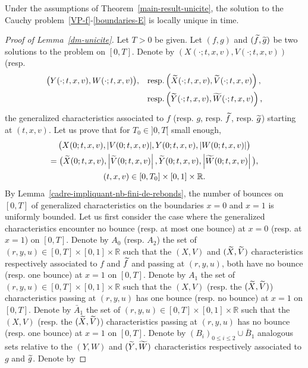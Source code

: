 \documentclass[AHL,Unicode,longabstracts,published]{cedram}
\newcommand{\R}{\mathbb{R}}
\let\oldtilde\tilde
\renewcommand*{\tilde}[1]{\mathchoice{\widetilde{#1}}{\widetilde{#1}}{\oldtilde{#1}}{\oldtilde{#1}}}
\begin{document}
\begin{lemm}\label{dm-unicite}
Under the assumptions of Theorem~\ref{main-result-unicite}, the solution to the Cauchy problem~\eqref{VP-f}-\eqref{boundaries-E} is locally unique in time.
\end{lemm}
\begin{proof}[{Proof of Lemma~\ref{dm-unicite}}]
Let $T>0$ be given. Let $(f,g)$ and $(\tilde{f},\tilde{g})$ be two solutions to the problem on $[0,T]$. Denote by $(X(\cdot ; t,x,v),V(\cdot ; t,x,v))$ (resp.
\begin{align*}
\big(Y(\cdot ; t,x,v),W(\cdot ; t,x,v)\big), \quad &\text{resp.} \left(\tilde{X}(\cdot ; t,x,v),\tilde{V}(\cdot ; t,x,v)\right), \\ 
&\text{resp.} \left(\tilde{Y}(\cdot ; t,x,v),\tilde{W}(\cdot ; t,x,v)\right),
\end{align*}
the generalized characteristics associated to $f$ (resp. $g$, resp. $\tilde{f}$, resp. $\tilde{g}$) starting at $(t,x,v)$. Let us prove that for $T_0\in]0,T[$ small enough,
\begin{multline*}
\big(X(0;t,x,v),|V(0;t,x,v)|,Y(0;t,x,v),|W(0;t,x,v)|\big)\\
= \big(\tilde{X}(0;t,x,v),\left|\tilde{V}(0;t,x,v)\right|,\tilde{Y}(0;t,x,v),\left|\tilde{W}(0;t,x,v)\right|\big),\\
(t,x,v)\in [0,T_0] \times [0,1] \times \R.
\end{multline*}
By Lemma~\ref{cadre-impliquant-nb-fini-de-rebonds}, the number of bounces on $[0,T]$ of generalized characteristics on the boundaries $x=0$ and $x=1$ is uniformly bounded. Let us first consider the case where the generalized characteristics encounter no bounce (resp. at most one bounce) at $x=0$ (resp. at $x=1$) on $[0,T]$. Denote by $A_0$ (resp. $A_2$) the set of $(r,y,u)\in [0,T] \times [0,1] \times \R $ such that the $(X,V)$ and $(\tilde{X},\tilde{V})$ characteristics respectively associated to $f$ and $\tilde{f}$ and passing at $(r,y,u)$, both have no bounce (resp. one bounce) at $x= 1$ on $[0,T]$. Denote by $A_1$ the set of $(r,y,u)\in [0,T] \times [0,1] \times \R $ such that the $(X,V)$ (resp. the $(\tilde{X},\tilde{V})$) characteristics passing at $(r,y,u)$ has one bounce (resp. no bounce) at $x= 1$ on $[0,T]$. Denote by $\bar{A}_1$ the set of $(r,y,u)\in [0,T] \times [0,1] \times \R $ such that the $(X,V)$ (resp. the $(\tilde{X},\tilde{V})$) characteristics passing at $(r,y,u)$ has no bounce (resp. one bounce) at $x= 1$ on $[0,T]$. Denote by $(B_i)_{0\leq i\leq 2}\cup \bar{B}_1$ analogous sets relative to the $(Y,W)$ and $(\tilde{Y},\tilde{W})$ characteristics respectively associated to $g$ and $\tilde{g}$. Denote by

\end{proof}
\end{document}
